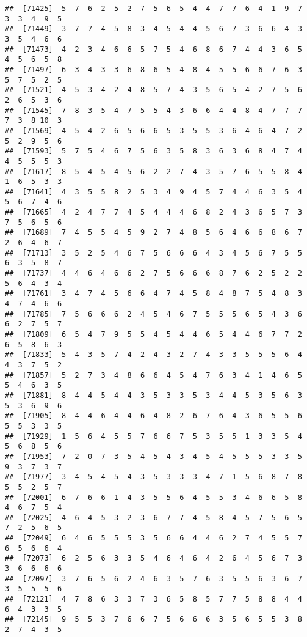 \documentclass[
]{book}
\begin{document}
\begin{verbatim}
##  [71425]  5  7  6  2  5  2  7  5  6  5  4  4  7  7  6  4  1  9  7  3  3  4  9  5
##  [71449]  3  7  7  4  5  8  3  4  5  4  4  5  6  7  3  6  6  4  3  3  5  4  6  6
##  [71473]  4  2  3  4  6  6  5  7  5  4  6  8  6  7  4  4  3  6  5  4  5  6  5  8
##  [71497]  6  3  4  3  3  6  8  6  5  4  8  4  5  5  6  6  7  6  3  5  7  5  2  5
##  [71521]  4  5  3  4  2  4  8  5  7  4  3  5  6  5  4  2  7  5  6  2  6  5  3  6
##  [71545]  7  8  3  5  4  7  5  5  4  3  6  6  4  4  8  4  7  7  7  7  3  8 10  3
##  [71569]  4  5  4  2  6  5  6  6  5  3  5  5  3  6  4  6  4  7  2  5  2  9  5  6
##  [71593]  5  7  5  4  6  7  5  6  3  5  8  3  6  3  6  8  4  7  4  4  5  5  5  3
##  [71617]  8  5  4  5  4  5  6  2  2  7  4  3  5  7  6  5  5  8  4  1  6  5  3  3
##  [71641]  4  3  5  5  8  2  5  3  4  9  4  5  7  4  4  6  3  5  4  5  6  7  4  6
##  [71665]  4  2  4  7  7  4  5  4  4  4  6  8  2  4  3  6  5  7  3  7  5  6  5  6
##  [71689]  7  4  5  5  4  5  9  2  7  4  8  5  6  4  6  6  8  6  7  2  6  4  6  7
##  [71713]  3  5  2  5  4  6  7  5  6  6  6  4  3  4  5  6  7  5  5  6  3  5  8  7
##  [71737]  4  4  6  4  6  6  2  7  5  6  6  6  8  7  6  2  5  2  2  5  6  4  3  4
##  [71761]  3  4  7  4  5  6  6  4  7  4  5  8  4  8  7  5  4  8  3  4  7  4  6  6
##  [71785]  7  5  6  6  6  2  4  5  4  6  7  5  5  5  6  5  4  3  6  6  2  7  5  7
##  [71809]  6  5  4  7  9  5  5  4  5  4  4  6  5  4  4  6  7  7  2  6  5  8  6  3
##  [71833]  5  4  3  5  7  4  2  4  3  2  7  4  3  3  5  5  5  6  4  4  3  7  5  2
##  [71857]  5  2  7  3  4  8  6  6  4  5  4  7  6  3  4  1  4  6  5  5  4  6  3  5
##  [71881]  8  4  4  5  4  4  3  5  3  3  5  3  4  4  5  3  5  6  3  5  3  6  9  6
##  [71905]  8  4  4  6  4  4  6  4  8  2  6  7  6  4  3  6  5  5  6  5  5  3  3  5
##  [71929]  1  5  6  4  5  5  7  6  6  7  5  3  5  5  1  3  3  5  4  5  6  8  5  6
##  [71953]  7  2  0  7  3  5  4  5  4  3  4  5  4  5  5  5  3  3  5  9  3  7  3  7
##  [71977]  3  4  5  4  5  4  3  5  3  3  3  4  7  1  5  6  8  7  8  5  5  2  5  7
##  [72001]  6  7  6  6  1  4  3  5  5  6  4  5  5  3  4  6  6  5  8  4  6  7  5  4
##  [72025]  4  6  4  5  3  2  3  6  7  7  4  5  8  4  5  7  5  6  5  7  2  5  6  5
##  [72049]  6  4  6  5  5  5  3  5  6  6  4  4  6  2  7  4  5  5  7  6  5  6  6  4
##  [72073]  6  2  5  6  3  3  5  4  6  4  6  4  2  6  4  5  6  7  3  3  6  6  6  6
##  [72097]  3  7  6  5  6  2  4  6  3  5  7  6  3  5  5  6  3  6  7  3  5  5  5  6
##  [72121]  4  7  8  6  3  3  7  3  6  5  8  5  7  7  5  8  8  4  4  6  4  3  3  5
##  [72145]  9  5  5  3  7  6  6  7  5  6  6  6  3  5  6  5  5  3  8  2  7  4  3  5

\end{verbatim}
\end{document}
